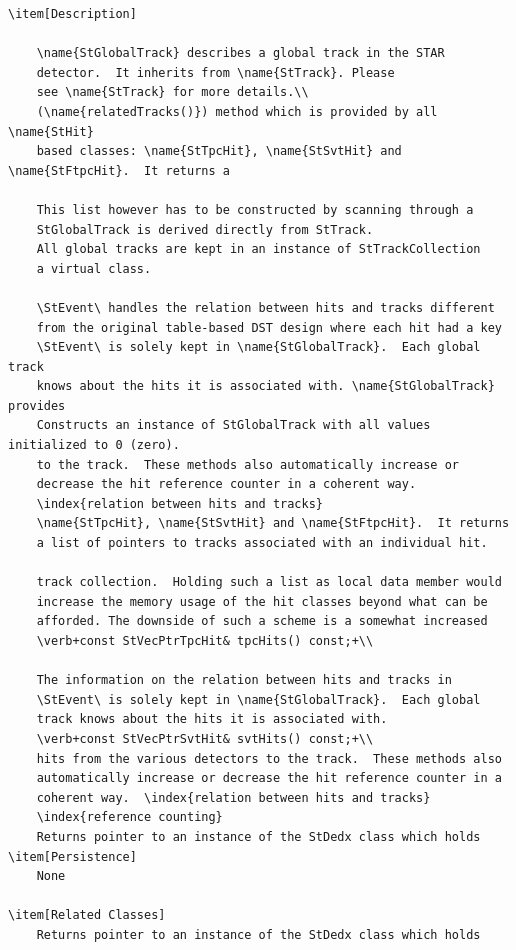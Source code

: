 \begin{Entry}
{\begin{verbatim}
\item[Description]
    
    \name{StGlobalTrack} describes a global track in the STAR
    detector.  It inherits from \name{StTrack}. Please
    see \name{StTrack} for more details.\\
    (\name{relatedTracks()}) method which is provided by all \name{StHit}
    based classes: \name{StTpcHit}, \name{StSvtHit} and \name{StFtpcHit}.  It returns a
   
    This list however has to be constructed by scanning through a
    StGlobalTrack is derived directly from StTrack.
    All global tracks are kept in an instance of StTrackCollection
    a virtual class.
    
    \StEvent\ handles the relation between hits and tracks different
    from the original table-based DST design where each hit had a key
    \StEvent\ is solely kept in \name{StGlobalTrack}.  Each global track
    knows about the hits it is associated with. \name{StGlobalTrack} provides
    Constructs an instance of StGlobalTrack with all values initialized to 0 (zero).
    to the track.  These methods also automatically increase or
    decrease the hit reference counter in a coherent way.
    \index{relation between hits and tracks}
    \name{StTpcHit}, \name{StSvtHit} and \name{StFtpcHit}.  It returns
    a list of pointers to tracks associated with an individual hit.
  
    track collection.  Holding such a list as local data member would
    increase the memory usage of the hit classes beyond what can be
    afforded. The downside of such a scheme is a somewhat increased
    \verb+const StVecPtrTpcHit& tpcHits() const;+\\
    
    The information on the relation between hits and tracks in
    \StEvent\ is solely kept in \name{StGlobalTrack}.  Each global
    track knows about the hits it is associated with.
    \verb+const StVecPtrSvtHit& svtHits() const;+\\
    hits from the various detectors to the track.  These methods also
    automatically increase or decrease the hit reference counter in a
    coherent way.  \index{relation between hits and tracks}
    \index{reference counting}
    Returns pointer to an instance of the StDedx class which holds
\item[Persistence]
    None

\item[Related Classes]
    Returns pointer to an instance of the StDedx class which holds
    

\end{verbatim}}
\end{Entry}
